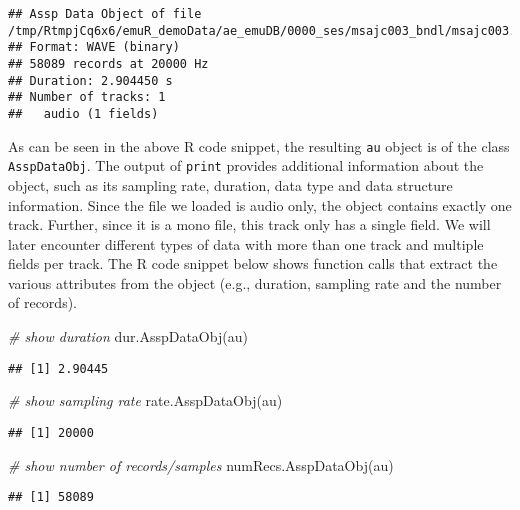 \documentclass[
]{book}
\newenvironment{Shaded}{\begin{snugshade}}{\end{snugshade}}
\newcommand{\CommentTok}[1]{\textcolor[rgb]{0.56,0.35,0.01}{\textit{#1}}}
\newcommand{\FunctionTok}[1]{\textcolor[rgb]{0.00,0.00,0.00}{#1}}
\newcommand{\NormalTok}[1]{#1}
\begin{document}
\begin{verbatim}
## Assp Data Object of file /tmp/RtmpjCq6x6/emuR_demoData/ae_emuDB/0000_ses/msajc003_bndl/msajc003.wav.
## Format: WAVE (binary)
## 58089 records at 20000 Hz
## Duration: 2.904450 s
## Number of tracks: 1 
##   audio (1 fields)
\end{verbatim}

As can be seen in the above R code snippet, the resulting \texttt{au} object is of the class \texttt{AsspDataObj}. The output of \texttt{print} provides additional information about the object, such as its sampling rate, duration, data type and data structure information. Since the file we loaded is audio only, the object contains exactly one track. Further, since it is a mono file, this track only has a single field. We will later encounter different types of data with more than one track and multiple fields per track. The R code snippet below shows function calls that extract the various attributes from the object (e.g., duration, sampling rate and the number of records).

\begin{Shaded}
\begin{Highlighting}[]
\CommentTok{\# show duration}
\FunctionTok{dur.AsspDataObj}\NormalTok{(au)}
\end{Highlighting}
\end{Shaded}

\begin{verbatim}
## [1] 2.90445
\end{verbatim}

\begin{Shaded}
\begin{Highlighting}[]
\CommentTok{\# show sampling rate}
\FunctionTok{rate.AsspDataObj}\NormalTok{(au)}
\end{Highlighting}
\end{Shaded}

\begin{verbatim}
## [1] 20000
\end{verbatim}

\begin{Shaded}
\begin{Highlighting}[]
\CommentTok{\# show number of records/samples}
\FunctionTok{numRecs.AsspDataObj}\NormalTok{(au)}
\end{Highlighting}
\end{Shaded}

\begin{verbatim}
## [1] 58089
\end{verbatim}
\end{document}
